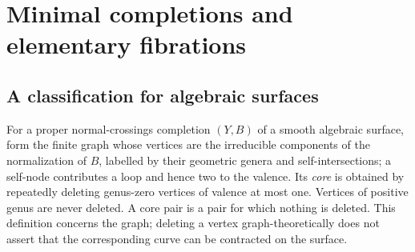 \section{Minimal completions and elementary fibrations}

\subsection{A classification for algebraic surfaces}

For a proper normal-crossings completion $(Y,B)$ of a smooth algebraic surface,
form the finite graph whose vertices are the irreducible components of the
normalization of $B$, labelled by their geometric genera and self-intersections;
a self-node contributes a loop and hence two to the valence.  Its
\emph{core} is obtained by repeatedly deleting genus-zero vertices of valence
at most one.  Vertices of positive genus are never deleted.  A core pair is a
pair for which nothing is deleted.  This definition concerns the graph; deleting
a vertex graph-theoretically does not assert that the corresponding curve can
be contracted on the surface.

